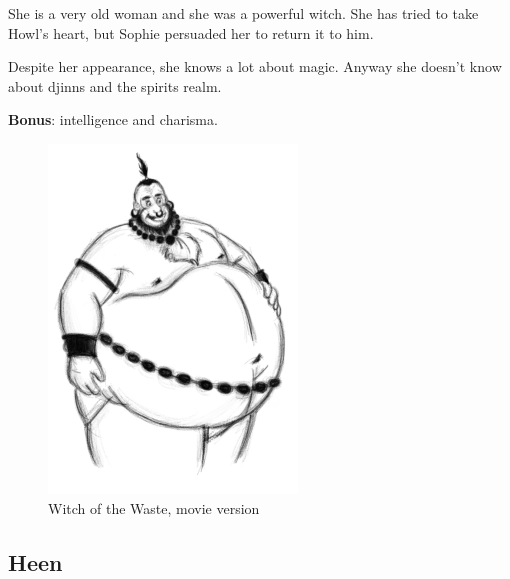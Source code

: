 \begin{minipage}{0.5\textwidth}
She is a very old woman and she was a powerful witch. She has tried to take Howl’s heart, but Sophie persuaded her to return it to him.

Despite her appearance, she knows a lot about magic. Anyway she doesn’t know about djinns and the spirits realm.

\textbf{Bonus}: intelligence and charisma.\\

\end{minipage}%
%
\hfill\begin{minipage}{0.4\textwidth}
  \begin{figure}[H]
    \hfill\includegraphics{Images/Characters/belzel}
    \caption{Witch of the Waste, movie version}
  \end{figure}
\end{minipage}

\subsection{Heen}

